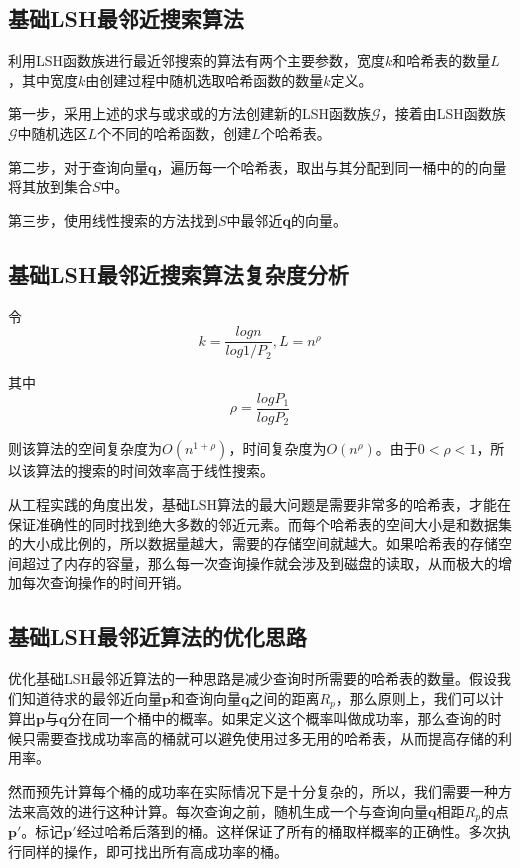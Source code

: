 \subsection{基础LSH最邻近搜索算法}

利用LSH函数族进行最近邻搜索的算法有两个主要参数，宽度$k$和哈希表的数量$L$，其中宽度$k$由创建过程中随机选取哈希函数的数量$k$定义。

第一步，采用上述的求与或求或的方法创建新的LSH函数族$\mathcal{G}$，接着由LSH函数族$\mathcal{G}$中随机选区$L$个不同的哈希函数，创建$L$个哈希表。

第二步，对于查询向量$\mathbf{q}$，遍历每一个哈希表，取出与其分配到同一桶中的的向量将其放到集合$S$中。

第三步，使用线性搜索的方法找到$S$中最邻近$\mathbf{q}$的向量。

\subsection{基础LSH最邻近搜索算法复杂度分析}
令
\begin{equation}
	k=\frac{log n}{log 1/P_2},L=n^\rho
\end{equation}

其中
\begin{equation}
	\rho =\frac{log P_1}{log P_2}
\end{equation}

则该算法的空间复杂度为$O(n^{1+\rho})$，时间复杂度为$O(n^\rho)$。由于$0<\rho <1$，所以该算法的搜索的时间效率高于线性搜索。

从工程实践的角度出发，基础LSH算法的最大问题是需要非常多的哈希表，才能在保证准确性的同时找到绝大多数的邻近元素。而每个哈希表的空间大小是和数据集的大小成比例的，所以数据量越大，需要的存储空间就越大。如果哈希表的存储空间超过了内存的容量，那么每一次查询操作就会涉及到磁盘的读取，从而极大的增加每次查询操作的时间开销。

\subsection{基础LSH最邻近算法的优化思路}

优化基础LSH最邻近算法的一种思路是减少查询时所需要的哈希表的数量。假设我们知道待求的最邻近向量$\mathbf{p}$和查询向量$\mathbf{q}$之间的距离$R_p$，那么原则上，我们可以计算出$\mathbf{p}$与$\mathbf{q}$分在同一个桶中的概率。如果定义这个概率叫做成功率，那么查询的时候只需要查找成功率高的桶就可以避免使用过多无用的哈希表，从而提高存储的利用率。

然而预先计算每个桶的成功率在实际情况下是十分复杂的，所以，我们需要一种方法来高效的进行这种计算。每次查询之前，随机生成一个与查询向量$\mathbf{q}$相距$R_p$的点$\mathbf{p'}$。标记$\mathbf{p'}$经过哈希后落到的桶。这样保证了所有的桶取样概率的正确性。多次执行同样的操作，即可找出所有高成功率的桶。

